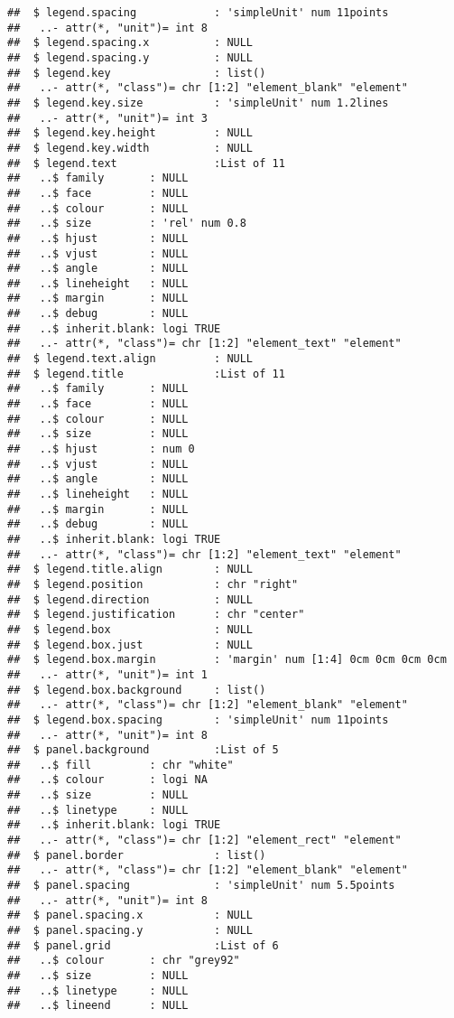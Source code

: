 \documentclass[
]{article}
\begin{document}
\begin{verbatim}
##  $ legend.spacing            : 'simpleUnit' num 11points
##   ..- attr(*, "unit")= int 8
##  $ legend.spacing.x          : NULL
##  $ legend.spacing.y          : NULL
##  $ legend.key                : list()
##   ..- attr(*, "class")= chr [1:2] "element_blank" "element"
##  $ legend.key.size           : 'simpleUnit' num 1.2lines
##   ..- attr(*, "unit")= int 3
##  $ legend.key.height         : NULL
##  $ legend.key.width          : NULL
##  $ legend.text               :List of 11
##   ..$ family       : NULL
##   ..$ face         : NULL
##   ..$ colour       : NULL
##   ..$ size         : 'rel' num 0.8
##   ..$ hjust        : NULL
##   ..$ vjust        : NULL
##   ..$ angle        : NULL
##   ..$ lineheight   : NULL
##   ..$ margin       : NULL
##   ..$ debug        : NULL
##   ..$ inherit.blank: logi TRUE
##   ..- attr(*, "class")= chr [1:2] "element_text" "element"
##  $ legend.text.align         : NULL
##  $ legend.title              :List of 11
##   ..$ family       : NULL
##   ..$ face         : NULL
##   ..$ colour       : NULL
##   ..$ size         : NULL
##   ..$ hjust        : num 0
##   ..$ vjust        : NULL
##   ..$ angle        : NULL
##   ..$ lineheight   : NULL
##   ..$ margin       : NULL
##   ..$ debug        : NULL
##   ..$ inherit.blank: logi TRUE
##   ..- attr(*, "class")= chr [1:2] "element_text" "element"
##  $ legend.title.align        : NULL
##  $ legend.position           : chr "right"
##  $ legend.direction          : NULL
##  $ legend.justification      : chr "center"
##  $ legend.box                : NULL
##  $ legend.box.just           : NULL
##  $ legend.box.margin         : 'margin' num [1:4] 0cm 0cm 0cm 0cm
##   ..- attr(*, "unit")= int 1
##  $ legend.box.background     : list()
##   ..- attr(*, "class")= chr [1:2] "element_blank" "element"
##  $ legend.box.spacing        : 'simpleUnit' num 11points
##   ..- attr(*, "unit")= int 8
##  $ panel.background          :List of 5
##   ..$ fill         : chr "white"
##   ..$ colour       : logi NA
##   ..$ size         : NULL
##   ..$ linetype     : NULL
##   ..$ inherit.blank: logi TRUE
##   ..- attr(*, "class")= chr [1:2] "element_rect" "element"
##  $ panel.border              : list()
##   ..- attr(*, "class")= chr [1:2] "element_blank" "element"
##  $ panel.spacing             : 'simpleUnit' num 5.5points
##   ..- attr(*, "unit")= int 8
##  $ panel.spacing.x           : NULL
##  $ panel.spacing.y           : NULL
##  $ panel.grid                :List of 6
##   ..$ colour       : chr "grey92"
##   ..$ size         : NULL
##   ..$ linetype     : NULL
##   ..$ lineend      : NULL

\end{verbatim}
\end{document}
